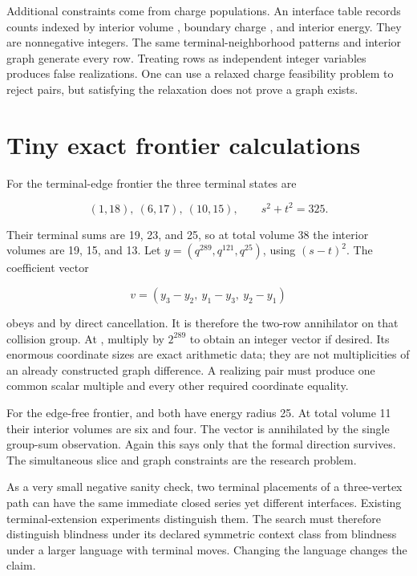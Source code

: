 \documentclass[
  11pt,
  a4paper,
]{report}
\let\nxtexttt\texttt
\renewcommand{\texttt}[1]{\nxtexttt{\seqsplit{#1}}}
\begin{document}
Additional constraints come from charge populations. An interface table
records counts indexed by interior volume \texttt{j}, boundary charge
\texttt{Q}, and interior energy. They are nonnegative integers. The same
terminal-neighborhood patterns and interior graph generate every row.
Treating rows as independent integer variables produces false
realizations. One can use a relaxed charge feasibility problem to reject
pairs, but satisfying the relaxation does not prove a graph exists.

\hypertarget{tiny-exact-frontier-calculations}{%
\section{Tiny exact frontier
calculations}\label{tiny-exact-frontier-calculations}}

For the terminal-edge frontier the three terminal states are

\[
(1,18),\ (6,17),\ (10,15),\qquad s^2+t^2=325.
\]

Their terminal sums are 19, 23, and 25, so at total volume 38 the
interior volumes are 19, 15, and 13. Let \(y=(q^{289},q^{121},q^{25})\),
using \((s-t)^{2}\). The coefficient vector

\[
v=(y_3-y_2,\ y_1-y_3,\ y_2-y_1)
\]

obeys \texttt{sum\_i\ v\_i=0} and \texttt{sum\_i\ y\_i\ v\_i=0} by
direct cancellation. It is therefore the two-row annihilator on that
collision group. At \texttt{q=1/2}, multiply by \(2^{289}\) to obtain an
integer vector if desired. Its enormous coordinate sizes are exact
arithmetic data; they are not multiplicities of an already constructed
graph difference. A realizing pair must produce one common scalar
multiple and every other required coordinate equality.

For the edge-free frontier, \texttt{(0,5)} and \texttt{(3,4)} both have
energy radius 25. At total volume 11 their interior volumes are six and
four. The vector \texttt{e\_(0,5)-e\_(3,4)} is annihilated by the single
group-sum observation. Again this says only that the formal direction
survives. The simultaneous slice and graph constraints are the research
problem.

As a very small negative sanity check, two terminal placements of a
three-vertex path can have the same immediate closed series yet
different interfaces. Existing terminal-extension experiments
distinguish them. The search must therefore distinguish blindness under
its declared symmetric context class from blindness under a larger
language with terminal moves. Changing the language changes the claim.
\end{document}
